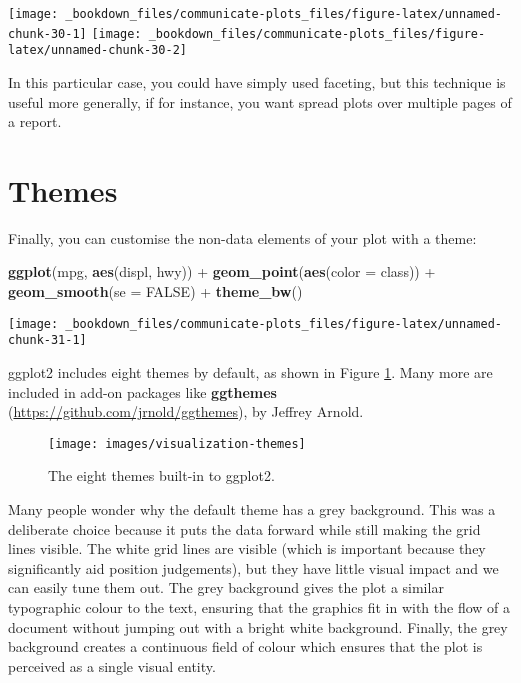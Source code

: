 \documentclass[]{book}
\newenvironment{Shaded}{\begin{snugshade}}{\end{snugshade}}
\newcommand{\KeywordTok}[1]{\textcolor[rgb]{0.13,0.29,0.53}{\textbf{{#1}}}}
\newcommand{\DataTypeTok}[1]{\textcolor[rgb]{0.13,0.29,0.53}{{#1}}}
\newcommand{\StringTok}[1]{\textcolor[rgb]{0.31,0.60,0.02}{{#1}}}
\newcommand{\OtherTok}[1]{\textcolor[rgb]{0.56,0.35,0.01}{{#1}}}
\newcommand{\NormalTok}[1]{{#1}}
\begin{document}
\texttt{[image: \_bookdown\_files/communicate-plots\_files/figure-latex/unnamed-chunk-30-1]}
\texttt{[image: \_bookdown\_files/communicate-plots\_files/figure-latex/unnamed-chunk-30-2]}

In this particular case, you could have simply used faceting, but this
technique is useful more generally, if for instance, you want spread
plots over multiple pages of a report.

\section{Themes}\label{themes}

Finally, you can customise the non-data elements of your plot with a
theme:

\begin{Shaded}
\begin{Highlighting}[]
\KeywordTok{ggplot}\NormalTok{(mpg, }\KeywordTok{aes}\NormalTok{(displ, hwy)) +}
\StringTok{  }\KeywordTok{geom_point}\NormalTok{(}\KeywordTok{aes}\NormalTok{(}\DataTypeTok{color =} \NormalTok{class)) +}
\StringTok{  }\KeywordTok{geom_smooth}\NormalTok{(}\DataTypeTok{se =} \OtherTok{FALSE}\NormalTok{) +}
\StringTok{  }\KeywordTok{theme_bw}\NormalTok{()}
\end{Highlighting}
\end{Shaded}

\begin{center}\texttt{[image: \_bookdown\_files/communicate-plots\_files/figure-latex/unnamed-chunk-31-1]} \end{center}

ggplot2 includes eight themes by default, as shown in Figure
\ref{fig:themes}. Many more are included in add-on packages like
\textbf{ggthemes} (\url{https://github.com/jrnold/ggthemes}), by Jeffrey
Arnold.

\begin{figure}

{\centering \texttt{[image: images/visualization-themes]} 

}

\caption{The eight themes built-in to ggplot2.}\label{fig:themes}
\end{figure}

Many people wonder why the default theme has a grey background. This was
a deliberate choice because it puts the data forward while still making
the grid lines visible. The white grid lines are visible (which is
important because they significantly aid position judgements), but they
have little visual impact and we can easily tune them out. The grey
background gives the plot a similar typographic colour to the text,
ensuring that the graphics fit in with the flow of a document without
jumping out with a bright white background. Finally, the grey background
creates a continuous field of colour which ensures that the plot is
perceived as a single visual entity.
\end{document}
